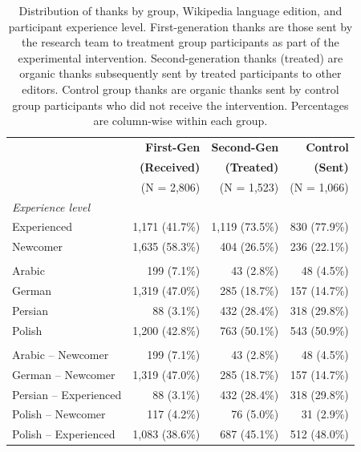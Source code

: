 \begin{table}[t]
\centering
\caption{Distribution of thanks by group, Wikipedia language edition, and participant experience level. First-generation thanks are those sent by the research team to treatment group participants as part of the experimental intervention. Second-generation thanks (treated) are organic thanks subsequently sent by treated participants to other editors. Control group thanks are organic thanks sent by control group participants who did not receive the intervention. Percentages are column-wise within each group.}
\label{table:thanks-distribution}
\begin{tabular}{lrrr}
\toprule
 & \textbf{First-Gen} & \textbf{Second-Gen} & \textbf{Control} \\
 & \textbf{(Received)} & \textbf{(Treated)} & \textbf{(Sent)} \\
 & (N = 2,806) & (N = 1,523) & (N = 1,066) \\
\midrule
\multicolumn{4}{l}{\textit{Experience level}} \\
\quad Experienced & 1,171 (41.7\%) & 1,119 (73.5\%) & 830 (77.9\%) \\
\quad Newcomer & 1,635 (58.3\%) & 404 (26.5\%) & 236 (22.1\%) \\
\addlinespace
\multicolumn{4}{l}{\textit{Language}} \\
\quad Arabic & 199 (7.1\%) & 43 (2.8\%) & 48 (4.5\%) \\
\quad German & 1,319 (47.0\%) & 285 (18.7\%) & 157 (14.7\%) \\
\quad Persian & 88 (3.1\%) & 432 (28.4\%) & 318 (29.8\%) \\
\quad Polish & 1,200 (42.8\%) & 763 (50.1\%) & 543 (50.9\%) \\
\addlinespace
\multicolumn{4}{l}{\textit{Language $\times$ Experience}} \\
\quad Arabic -- Newcomer & 199 (7.1\%) & 43 (2.8\%) & 48 (4.5\%) \\
\quad German -- Newcomer & 1,319 (47.0\%) & 285 (18.7\%) & 157 (14.7\%) \\
\quad Persian -- Experienced & 88 (3.1\%) & 432 (28.4\%) & 318 (29.8\%) \\
\quad Polish -- Newcomer & 117 (4.2\%) & 76 (5.0\%) & 31 (2.9\%) \\
\quad Polish -- Experienced & 1,083 (38.6\%) & 687 (45.1\%) & 512 (48.0\%) \\
\bottomrule
\end{tabular}
\end{table}
